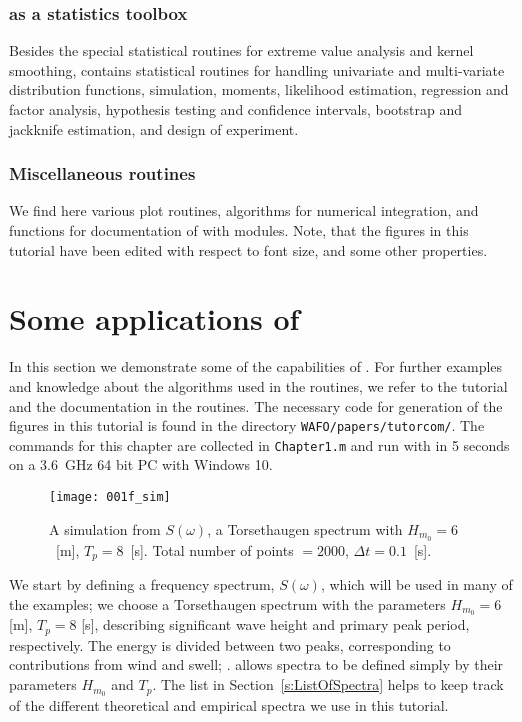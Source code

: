 \subsubsection{\progname{} as a statistics toolbox}
Besides the special statistical routines for extreme value analysis
and kernel smoothing,  \progname{} contains statistical routines for
handling univariate and multi-variate distribution functions,
simulation, moments, likelihood estimation, regression and factor
analysis, hypothesis testing and confidence intervals, bootstrap and
jackknife estimation, and design of experiment.

\subsubsection{Miscellaneous routines}
We find here various plot routines, algorithms for numerical
integration, and functions for documentation of \progname{} with
modules. Note, that the figures in this tutorial have been edited with
respect to font size, and some other properties.

\section{Some applications of \progname{}}\label{sec:WAFOapplications}
In this section we demonstrate some of the
capabilities of \progname{}. For further examples and knowledge about the
algorithms used in the routines, we refer to the tutorial and the
documentation in the routines. The necessary \ML{} code
for generation of the figures in this tutorial is found in the directory
\verb+WAFO/papers/tutorcom/+. The commands for this chapter are collected in
\verb+Chapter1.m+ and run with  in 5 seconds on a 3.6~GHz 64 bit PC with Windows 10.

\begin{figure}
  \centering
  \texttt{[image: 001f\_sim]}
\vspace{-3mm}
\caption[Example of simulated wave profile]{A simulation
    from $S(\omega)$, a Torsethaugen spectrum with
    $H_{m_0}=6$~[m], $T_p=8$~[s].  Total number of points
    $=2000$, $\Delta t=0.1$~[s].}
\label{fig:simulation}
\end{figure}

  We start by defining a frequency spectrum, $S(\omega)$, which will be
  used in many of the examples; we choose a Torsethaugen spectrum with
  the parameters $H_{m_0}=6$ [m], $T_p=8$ [s], describing significant wave
  height and primary peak period, respectively. The energy is divided
  between two peaks, corresponding to contributions from wind and swell;
  \cite{Torsethaugen1996Model}. %
  \progname{} allows spectra to be defined simply by
  their parameters $H_{m_0}$ and $T_p$. The list in Section~\ref{s:ListOfSpectra} 
  helps to keep track of the different theoretical and empirical spectra we use in this tutorial. 

